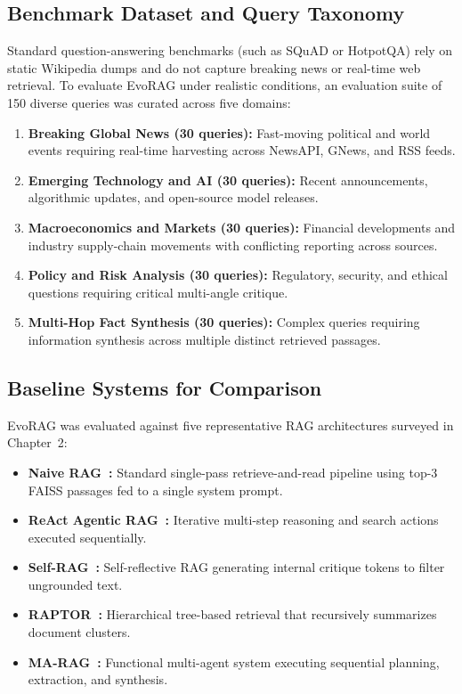 \subsection{Benchmark Dataset and Query Taxonomy}
Standard question-answering benchmarks (such as SQuAD or HotpotQA) rely on static Wikipedia dumps and do not capture breaking news or real-time web retrieval. To evaluate EvoRAG under realistic conditions, an evaluation suite of 150 diverse queries was curated across five domains:
\begin{enumerate}
    \item \textbf{Breaking Global News (30 queries):} Fast-moving political and world events requiring real-time harvesting across NewsAPI, GNews, and RSS feeds.
    \item \textbf{Emerging Technology and AI (30 queries):} Recent announcements, algorithmic updates, and open-source model releases.
    \item \textbf{Macroeconomics and Markets (30 queries):} Financial developments and industry supply-chain movements with conflicting reporting across sources.
    \item \textbf{Policy and Risk Analysis (30 queries):} Regulatory, security, and ethical questions requiring critical multi-angle critique.
    \item \textbf{Multi-Hop Fact Synthesis (30 queries):} Complex queries requiring information synthesis across multiple distinct retrieved passages.
\end{enumerate}

\subsection{Baseline Systems for Comparison}
EvoRAG was evaluated against five representative RAG architectures surveyed in Chapter~2:
\begin{itemize}
    \item \textbf{Naive RAG~\cite{lewis2020rag}:} Standard single-pass retrieve-and-read pipeline using top-3 FAISS passages fed to a single system prompt.
    \item \textbf{ReAct Agentic RAG~\cite{yao2022react}:} Iterative multi-step reasoning and search actions executed sequentially.
    \item \textbf{Self-RAG~\cite{asai2023selfrag}:} Self-reflective RAG generating internal critique tokens to filter ungrounded text.
    \item \textbf{RAPTOR~\cite{sarthi2024raptor}:} Hierarchical tree-based retrieval that recursively summarizes document clusters.
    \item \textbf{MA-RAG~\cite{nguyen2025marag}:} Functional multi-agent system executing sequential planning, extraction, and synthesis.
\end{itemize}

